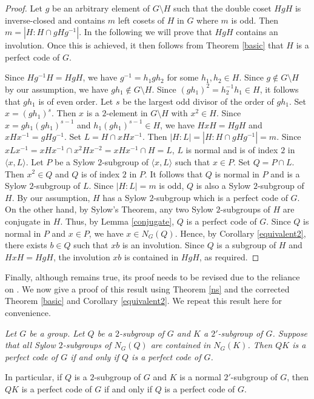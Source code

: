 \documentclass[12pt, a4paper]{article}
\theoremstyle{definition}
\newenvironment{manualtheorem}[1]{%
  \renewcommand\themanualtheoreminner{#1}%
  \manualtheoreminner
}{\endmanualtheoreminner}
\begin{document}
\begin{proof}
Let $g$ be an arbitrary element of $G\setminus H$ such that the double coset $HgH$ is inverse-closed and contains $m$ left cosets of $H$ in $G$ where $m$ is odd. Then $m=|H:H\cap gHg^{-1}|$. In the following we will prove that $HgH$ contains an involution. Once this is achieved, it then follows from Theorem \ref{basic} that $H$ is a perfect code of $G$.

Since $Hg^{-1}H=HgH$, we have $g^{-1}=h_{1}gh_2$ for some $h_1,h_2\in H$. Since $g\notin G\setminus H$ by our assumption, we have $gh_1\notin G\setminus H$. Since $(gh_1)^2=h_{2}^{-1}h_1\in H$, it follows that $gh_{1}$ is of even order. Let $s$ be the largest odd divisor of the order of $gh_{1}$. Set $x=(gh_1)^{s}$. Then $x$ is a $2$-element in $G\setminus H$ with $x^{2}\in H$. Since $x=gh_1(gh_1)^{s-1}$ and $h_1(gh_1)^{s-1}\in H$, we have $HxH=HgH$ and $xHx^{-1}=gHg^{-1}$. Set $L=H\cap xHx^{-1}$. Then $|H:L|=|H:H\cap gHg^{-1}|=m$. Since $xLx^{-1}=xHx^{-1}\cap x^2Hx^{-2}=xHx^{-1}\cap H =L$, $L$ is normal and is of index $2$ in $\langle x,L\rangle$. Let $P$ be a Sylow $2$-subgroup of $\langle x,L\rangle$ such that $x\in P$. Set $Q=P\cap L$. Then $x^{2}\in Q$ and $Q$ is of index $2$ in $P$. It follows that $Q$ is normal in $P$ and is a Sylow $2$-subgroup of $L$. Since $|H:L|=m$ is odd, $Q$ is also a Sylow $2$-subgroup of $H$.
By our assumption, $H$ has a Sylow $2$-subgroup which is a perfect code of $G$. On the other hand, by Sylow's Theorem, any two Sylow $2$-subgroups of $H$ are conjugate in $H$. Thus, by Lemma \ref{conjugate}, $Q$ is a perfect code of $G$. Since $Q$ is normal in $P$ and $x\in P$, we have $x\in N_{G}(Q)$. Hence, by Corollary \ref{equivalent2}, there exists $b\in Q$ such that $xb$ is an involution. Since $Q$ is a subgroup of $H$ and $HxH=HgH$, the involution $xb$ is contained in $HgH$, as required.
\end{proof}

Finally, although \cite[Theorem 4.3]{ZZ21} remains true, its proof needs to be revised due to the reliance on \cite[Corollary 3.3]{ZZ21}. We now give a proof of this result using Theorem \ref{ns} and the corrected Theorem \ref{basic} and Corollary \ref{equivalent2}. We repeat this result here for convenience.

\begin{manualtheorem}{4.3}
\label{QK}
{\em Let $G$ be a group. Let $Q$ be a $2$-subgroup of $G$ and $K$ a $2'$-subgroup of $G$. Suppose that all Sylow $2$-subgroups of $N_{G}(Q)$ are contained in $N_{G}(K)$. Then $QK$ is a perfect code of $G$ if and only if $Q$ is a perfect code of $G$.

In particular, if $Q$ is a $2$-subgroup of $G$ and $K$ is a normal $2'$-subgroup of $G$, then $QK$ is a perfect code of $G$ if and only if $Q$ is a perfect code of $G$.}
\end{manualtheorem}
\end{document}
